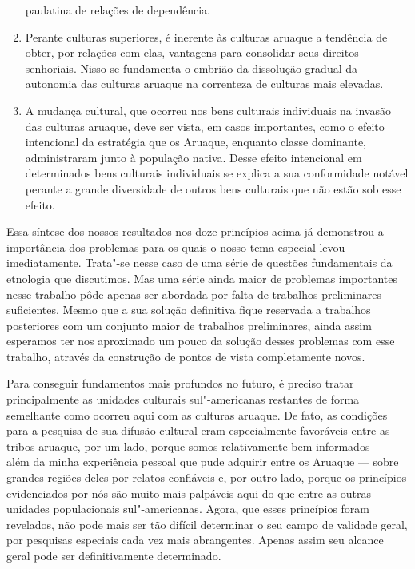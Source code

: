 \begin{enumerate}
  paulatina de relações de dependência.
\item
  Perante culturas superiores, é inerente às culturas aruaque a
  tendência de obter, por relações com elas, vantagens para consolidar
  seus direitos senhoriais. Nisso se fundamenta o embrião da dissolução
  gradual da autonomia das culturas aruaque na correnteza de culturas
  mais elevadas.
\item
  A mudança cultural, que ocorreu nos bens culturais individuais na
  invasão das culturas aruaque, deve ser vista, em casos importantes,
  como o efeito intencional da estratégia que os Aruaque, enquanto
  classe dominante, administraram junto à população nativa. Desse
  efeito intencional em determinados bens culturais individuais se
  explica a sua conformidade notável perante a grande diversidade de
  outros bens culturais que não estão sob esse efeito.
\end{enumerate}

Essa síntese dos nossos resultados nos doze princípios acima já
demonstrou a importância dos problemas para os quais o nosso tema
especial levou imediatamente. Trata"-se nesse caso de uma série de
questões fundamentais da etnologia que discutimos. Mas uma série ainda
maior de problemas importantes nesse trabalho pôde apenas ser abordada
por falta de trabalhos preliminares suficientes. Mesmo que a sua solução
definitiva fique reservada a trabalhos posteriores com um conjunto maior
de trabalhos preliminares, ainda assim esperamos ter nos aproximado um
pouco da solução desses problemas com esse trabalho, através da
construção de pontos de vista completamente novos.

Para conseguir fundamentos mais profundos no futuro, é preciso tratar
principalmente as unidades culturais sul"-americanas restantes de forma
semelhante como ocorreu aqui com as culturas aruaque. De fato, as
condições para a pesquisa de sua difusão cultural eram especialmente
favoráveis entre as tribos aruaque, por um lado, porque somos
relativamente bem informados --- além da minha experiência pessoal que
pude adquirir entre os Aruaque --- sobre grandes regiões deles por
relatos confiáveis e, por outro lado, porque os princípios evidenciados
por nós são muito mais palpáveis aqui do que entre as outras unidades
populacionais sul"-americanas. Agora, que esses princípios foram
revelados, não pode mais ser tão difícil determinar o seu campo de
validade geral, por pesquisas especiais cada vez mais abrangentes.
Apenas assim seu alcance geral pode ser definitivamente determinado.

